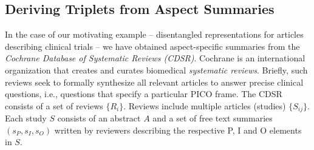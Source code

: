 \documentclass[11pt,a4paper]{article}
\begin{document}
\subsection{Deriving Triplets from Aspect Summaries}

In the case of our motivating example 
-- 
disentangled representations for articles describing clinical trials 
-- 
we have obtained aspect-specific summaries from the \emph{Cochrane Database of Systematic Reviews (CDSR)}. Cochrane is an international organization that creates and curates biomedical \emph{systematic reviews}. Briefly, such reviews seek to formally synthesize all relevant articles to answer precise clinical questions, i.e., questions that specify a particular PICO frame. The CDSR consists of a set of reviews $\{R_i\}$. Reviews include multiple articles (studies) $\{S_{ij}\}$. Each study $S$ consists of an abstract $A$ and a set of free text summaries $(s_P, s_I, s_O)$ written by reviewers describing the respective P, I and O elements in $S$.





\end{document}
